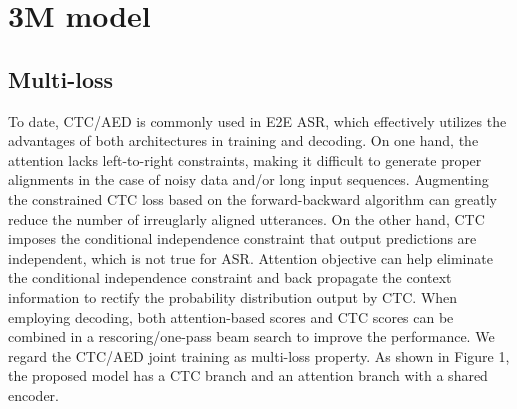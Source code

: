 \documentclass[a4paper]{article}
\begin{document}
\begin{table*}
\caption{\textit{Results of Conformer, Conformer-MLevel, Conformer-MoE and 3M. } }
\label{tab:1}
\begin{center}
\end{center}
\end{table*}
\vspace{10pt}
\section{3M model}
\subsection{Multi-loss}
To date, CTC/AED is commonly used in E2E ASR, which effectively utilizes the
advantages of both architectures in training and decoding. On one hand, the attention lacks left-to-right constraints, making it difficult to generate proper alignments in the case of noisy data and/or long input sequences. Augmenting the constrained CTC loss based on the forward-backward algorithm can greatly reduce the number of irreuglarly aligned utterances. On the other hand, CTC imposes the conditional independence constraint that output predictions are independent, which is not true for ASR. Attention objective can help eliminate the conditional independence constraint and back propagate the context information to rectify the probability distribution output by CTC.
When employing decoding, both attention-based scores and CTC scores can be combined in a rescoring/one-pass beam search to improve the performance. We regard the CTC/AED joint training as multi-loss property. As shown in Figure 1, the proposed model has a CTC branch and an attention branch with a shared encoder.
\end{document}
